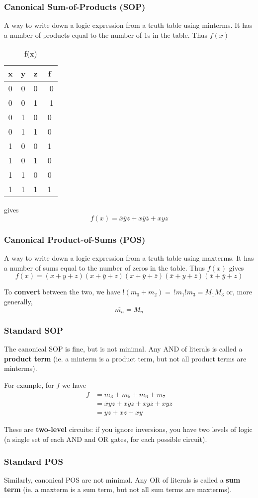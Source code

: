 \documentclass[12pt]{article}
\newcommand{\truththree}[9]{\begin{table}[ht]\centering\caption{#1}\begin{tabular}{ccc|c}x & y & z & f \\ \hline 0 & 0 & 0 & #2 \\ 0 & 0 & 1 & #3 \\ 0 & 1 & 0 & #4 \\ 0 & 1 & 1 & #5 \\ 1 & 0 & 0 & #6\\ 1 & 0 & 1 & #7\\ 1 & 1 & 0 & #8\\ 1 & 1 & 1 & #9\\\end{tabular}\end{table}}
\begin{document}
\subsubsection*{Canonical Sum-of-Products (SOP)}
A way to write down a logic expression from a truth table using minterms. It has a number of products equal to the number of 1s in the table. Thus $f(x)$ \truththree{f(x)}{0}{1}{0}{0}{1}{0}{0}{1} gives \[ f(x) = \overline{x}\overline{y}z + x\overline{y}\overline{z} + xyz \]

\subsubsection*{Canonical Product-of-Sums (POS)}
A way to write down a logic expression from a truth table using maxterms. It has a number of sums equal to the number of zeros in the table. Thus $f(x)$ gives \[ f(x) = (x + y + z)(x + \overline{y} + z)(x + \overline{y} + \overline{z})(\overline{x} + y + \overline{z})(\overline{x} + \overline{y} + z) \]

To {\bf convert} between the two, we have $!(m_0 + m_2) = \ !m_1!m_3 = M_1M_3$ or, more generally, \[ \overline{m_n} = M_n \]

\subsubsection*{Standard SOP}
The canonical SOP is fine, but is not minimal. Any AND of literals is called a {\bf product term} (ie. a minterm is a product term, but not all product terms are minterms).

For example, for $f$ we have
\begin{align*}
f &= m_3 + m_5 + m_6 + m_7\\
  &= \overline{x}yz + x\overline{y}z + xy\overline{z} + xyz\\
  &= yz + xz + xy
\end{align*}

These are {\bf two-level} circuits: if you ignore inversions, you have two levels of logic (a single set of each AND and OR gates, for each possible circuit).

\subsubsection*{Standard POS}
Similarly, canonical POS are not minimal. Any OR of literals is called a {\bf sum term} (ie. a maxterm is a sum term, but not all sum terms are maxterms).
\end{document}

